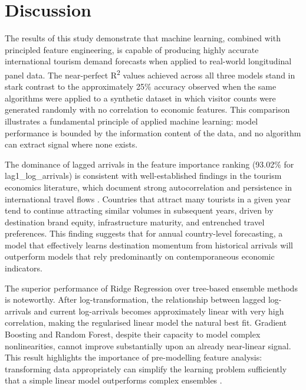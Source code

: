 \documentclass[conference]{IEEEtran}
\begin{document}
\section{Discussion}

The results of this study demonstrate that machine
learning, combined with principled feature engineering,
is capable of producing highly accurate international
tourism demand forecasts when applied to real-world
longitudinal panel data. The near-perfect R\textsuperscript{2}
values achieved across all three models stand in stark
contrast to the approximately 25\% accuracy observed
when the same algorithms were applied to a synthetic
dataset in which visitor counts were generated randomly
with no correlation to economic features. This comparison
illustrates a fundamental principle of applied machine
learning: model performance is bounded by the information
content of the data, and no algorithm can extract signal
where none exists.

The dominance of lagged arrivals in the feature importance
ranking (93.02\% for lag1\_log\_arrivals) is consistent
with well-established findings in the tourism economics
literature, which document strong autocorrelation and
persistence in international travel flows
\cite{gunter2016}. Countries that attract many tourists
in a given year tend to continue attracting similar
volumes in subsequent years, driven by destination brand
equity, infrastructure maturity, and entrenched travel
preferences. This finding suggests that for annual
country-level forecasting, a model that effectively
learns destination momentum from historical arrivals
will outperform models that rely predominantly on
contemporaneous economic indicators.

The superior performance of Ridge Regression over tree-based
ensemble methods is noteworthy. After log-transformation,
the relationship between lagged log-arrivals and current
log-arrivals becomes approximately linear with very high
correlation, making the regularised linear model
the natural best fit. Gradient Boosting and Random Forest,
despite their capacity to model complex nonlinearities,
cannot improve substantially upon an already near-linear
signal. This result highlights the importance of
pre-modelling feature analysis: transforming data
appropriately can simplify the learning problem
sufficiently that a simple linear model outperforms
complex ensembles \cite{friedman2001}.
\end{document}
